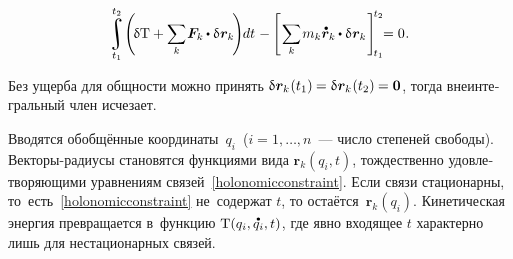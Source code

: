 \begin{otherlanguage}{russian}
\nopagebreak\vspace{-0.25em}\begin{equation}
\displaystyle \integral\displaylimits_{t_1}^{\raisemath{.12em}{t_2}}
\hspace{-0.4ex}
\left( \hspace{-0.32ex} \variation{\mathrm{T}}
+ \scalebox{0.95}[0.98]{$ \displaystyle \sum_{\smash{k}} $} \hspace{.16ex} \bm{F}_k \hspace{-0.1ex} \dotp \variation{\hspace{.1ex}\bm{r}_k} \hspace{-0.32ex} \right) \hspace{-0.5ex} dt \hspace{.16ex}
- \hspace{-0.1ex} \left[ \hspace{.2ex} \scalebox{0.95}[0.98]{$ \displaystyle \sum_{\smash{k}} $} \hspace{.2ex} m_k \mathdotabove{\bm{r}}_k \hspace{-0.1ex} \dotp \variation{\hspace{.1ex}\bm{r}_k} \hspace{.16ex} \right]_{\hspace{-0.32ex}t_1}^{\hspace{-0.32ex}t_2}
\hspace{-0.8ex} = 0 \hspace{.1ex} .
\end{equation}

\vspace{-0.16em} \noindent Без ущерба для общности можно принять ${\variation{\hspace{.1ex}\bm{r}_k}\hspace{.1ex}(t_1) \hspace{-0.1ex} = \variation{\hspace{.1ex}\bm{r}_k}\hspace{.1ex}(t_2) \hspace{-0.1ex} = \bm{0}}$, тогда внеинтегральный член исчезает.

Вводятся обобщённые координаты~$q_i$~(${i = 1, \ldots, n}$~--- число степеней свободы). Векторы-радиусы становятся функциями \hbox{вида} ${\bm{r}_k(q_i, t)}$, тождественно удовлетворяющими уравнениям связей~\eqref{holonomicconstraint}. Если связи стационарны, то~есть~\eqref{holonomicconstraint} не~содержат $t$, то остаётся~${\bm{r}_k(q_i)}$. Кинетическая энергия превращается в~функцию ${\mathrm{T}(q_i, \mathdotabove{q}_i, t)}$, где явно входящее $t$ характерно лишь для нестационарных связей.


\end{otherlanguage}
